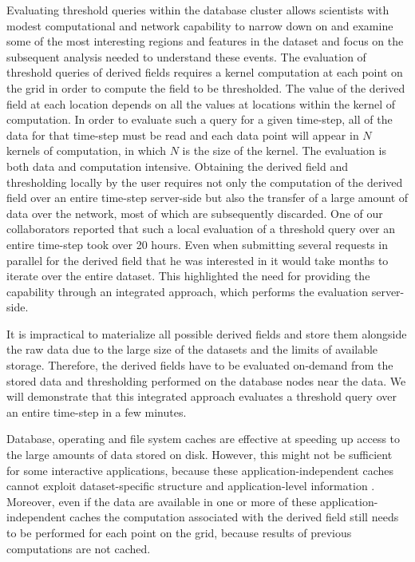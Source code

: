 \documentclass{sig-alternate}
\begin{document}
Evaluating threshold queries within the database cluster allows scientists with modest computational and network capability to narrow down on and
examine some of the most interesting regions and features in the dataset and focus on the subsequent analysis needed to understand these events.
The evaluation of threshold queries of derived fields requires a kernel computation at each point on the grid in order to compute the field to be thresholded.
The value of the derived field at each location depends on all the values at locations within the kernel of computation. 
In order to evaluate such a query for a given time-step, all of the data for that time-step must be read and each data point 
will appear in $N$ kernels of computation, in which $N$ is the size of the kernel. The evaluation is both data and computation intensive.
Obtaining the derived field and thresholding locally by the user requires not only the computation of the derived field over an entire time-step server-side 
but also the transfer of a large amount of data over the network, most of which are subsequently discarded. 
One of our collaborators reported that such a local evaluation of a threshold
query over an entire time-step took over 20 hours. Even when submitting several requests in parallel for the derived field that he was interested in it
would take months to iterate over the entire dataset. This highlighted the need for providing the capability through an integrated approach,
which performs the evaluation server-side.

It is impractical to materialize all possible derived fields and store them alongside the raw data
due to the large size of the datasets and the limits of available storage. Therefore, the derived fields 
have to be evaluated on-demand from the stored data and thresholding performed on the database nodes near the data.
We will demonstrate that this integrated approach evaluates a threshold query over an entire time-step in a few minutes.

Database, operating and file system caches are effective at speeding up access to the large amounts of data stored on disk. However, this might not be
sufficient for some interactive applications, because these application-independent caches cannot exploit dataset-specific structure and application-level
information \cite{Lopez}. Moreover, even if the data are available in one or more of these application-independent caches the computation associated 
with the derived field still needs to be performed for each point on the grid, because results of previous computations are not cached. 
\end{document}
